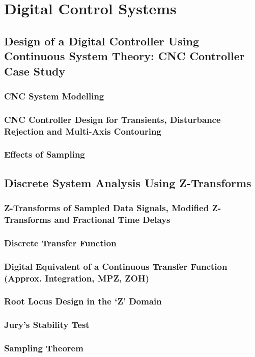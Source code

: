 \chapter{Digital Control Systems}

\section{Design of a Digital Controller Using Continuous System Theory: CNC Controller Case Study}
\subsection{CNC System Modelling}
\subsection{CNC Controller Design for Transients, Disturbance Rejection and Multi-Axis Contouring}
\subsection{Effects of Sampling}

\section{Discrete System Analysis Using Z-Transforms}
\subsection{Z-Transforms of Sampled Data Signals, Modified Z-Transforms and Fractional Time Delays}
\subsection{Discrete Transfer Function}
\subsection{Digital Equivalent of a Continuous Transfer Function (Approx. Integration, MPZ, ZOH)}
\subsection{Root Locus Design in the ‘Z’ Domain}
\subsection{Jury’s Stability Test}
\subsection{Sampling Theorem}

